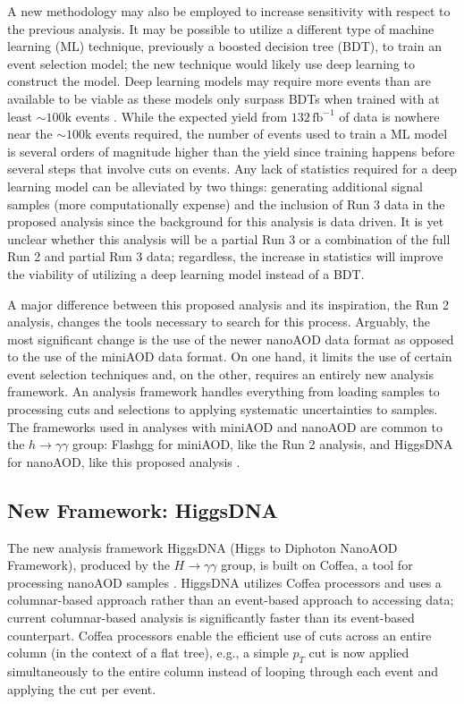 \documentclass[12pt]{article}
\begin{document}
A new methodology may also be employed to increase sensitivity with respect to the previous analysis. It may be possible to utilize a different type of machine learning (ML) technique, previously a boosted decision tree (BDT), to train an event selection model; the new technique would likely use deep learning to construct the model. Deep learning models may require more events than are available to be viable as these models only surpass BDTs when trained with at least ${\sim} 100\mathrm{k}$ events \cite{DNN_May}. While the expected yield from $132\, \mathrm{fb}^{-1}$ of data is nowhere near the ${\sim} 100\mathrm{k}$ events required, the number of events used to train a ML model is several orders of magnitude higher than the yield since training happens before several steps that involve cuts on events. Any lack of statistics required for a deep learning model can be alleviated by two things: generating additional signal samples (more computationally expense) and the inclusion of Run 3 data in the proposed analysis since the background for this analysis is data driven. It is yet unclear whether this analysis will be a partial Run 3 or a combination of the full Run 2 and partial Run 3 data; regardless, the increase in statistics will improve the viability of utilizing a deep learning model instead of a BDT.\par

A major difference between this proposed analysis and its inspiration, the Run 2 analysis, changes the tools necessary to search for this process. Arguably, the most significant change is the use of the newer nanoAOD data format as opposed to the use of the miniAOD data format. On one hand, it limits the use of certain event selection techniques and, on the other, requires an entirely new analysis framework. An analysis framework handles everything from loading samples to processing cuts and selections to applying systematic uncertainties to samples. The frameworks used in analyses with miniAOD and nanoAOD are common to the $h\rightarrow\gamma\gamma$ group: Flashgg for miniAOD, like the Run 2 analysis, and HiggsDNA for nanoAOD, like this proposed analysis \cite{Flashgg, HiggsDNA}.\par

\subsection{New Framework: HiggsDNA}
The new analysis framework HiggsDNA (Higgs to Diphoton NanoAOD Framework), produced by the $H \rightarrow \gamma\gamma$ group, is built on Coffea, a tool for processing nanoAOD samples \cite{lindsey_gray_2023_8408347}. HiggsDNA utilizes Coffea processors and uses a columnar-based approach rather than an event-based approach to accessing data; current columnar-based analysis is significantly faster than its event-based counterpart. Coffea processors enable the efficient use of cuts across an entire column (in the context of a flat tree), e.g., a simple $p_T$ cut is now applied simultaneously to the entire column instead of looping through each event and applying the cut per event.\par
\end{document}
